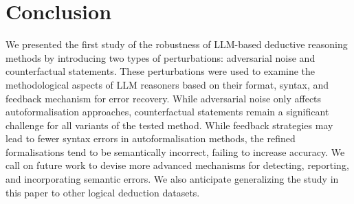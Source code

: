 \section{Conclusion}
We presented the first study of the robustness of \ac{LLM}-based deductive reasoning methods by introducing two types of perturbations: adversarial noise and counterfactual statements. These perturbations were used to examine the methodological aspects of \ac{LLM} reasoners based on their format, syntax, and feedback mechanism for error recovery. While adversarial noise only affects autoformalisation approaches, counterfactual statements remain a significant challenge for all variants of the tested method. While feedback strategies may lead to fewer syntax errors in autoformalisation methods, the refined formalisations tend to be semantically incorrect, failing to increase accuracy. We call on future work to devise more advanced mechanisms for detecting, reporting, and incorporating semantic errors. We also anticipate generalizing the study in this paper to other logical deduction datasets.
